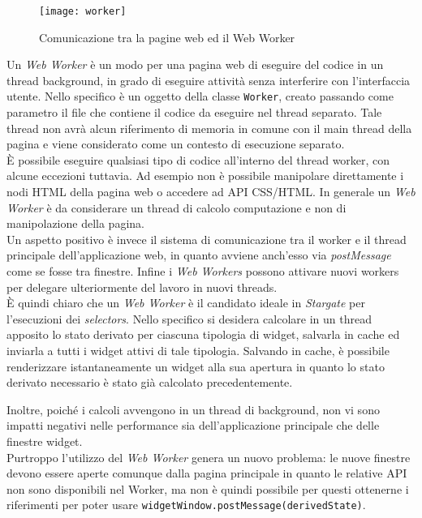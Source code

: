 \begin{figure}[H] 
  \centering 
  \texttt{[image: worker]} 
  \caption{Comunicazione tra la pagine web ed il Web Worker}
\end{figure}

Un \textit{Web Worker} è un modo per una pagina web di eseguire del codice in un thread background, in grado di eseguire attività senza interferire con l'interfaccia utente. Nello specifico è un oggetto della classe \texttt{Worker}, creato passando come parametro il file che contiene il codice da eseguire nel thread separato. Tale thread non avrà alcun riferimento di memoria in comune con il main thread della pagina e viene considerato come un contesto di esecuzione separato. \\

È possibile eseguire qualsiasi tipo di codice all'interno del thread worker, con alcune eccezioni tuttavia. Ad esempio non è possibile manipolare direttamente i nodi HTML della pagina web o accedere ad API CSS/HTML. In generale un \textit{Web Worker} è da considerare un thread di calcolo computazione e non di manipolazione della pagina. \\

Un aspetto positivo è invece il sistema di comunicazione tra il worker e il thread principale dell'applicazione web, in quanto avviene anch'esso via \textit{postMessage} come se fosse tra finestre. Infine i \textit{Web Workers} possono attivare nuovi workers per delegare ulteriormente del lavoro in nuovi threads. \\

È quindi chiaro che un \textit{Web Worker} è il candidato ideale in \textit{Stargate} per l'esecuzioni dei \textit{selectors}. Nello specifico si desidera calcolare in un thread apposito lo stato derivato per ciascuna tipologia di widget, salvarla in cache ed inviarla a tutti i widget attivi di tale tipologia. Salvando in cache, è possibile renderizzare istantaneamente un widget alla sua apertura in quanto lo stato derivato necessario è stato già calcolato precedentemente.

Inoltre, poiché i calcoli avvengono in un thread di background, non vi sono impatti negativi nelle performance sia dell'applicazione principale che delle finestre widget. \\

Purtroppo l'utilizzo del \textit{Web Worker} genera un nuovo problema: le nuove finestre devono essere aperte comunque dalla pagina principale in quanto le relative API non sono disponibili nel Worker, ma non è quindi possibile per questi ottenerne i riferimenti per poter usare \texttt{widgetWindow.postMessage(derivedState)}. 

